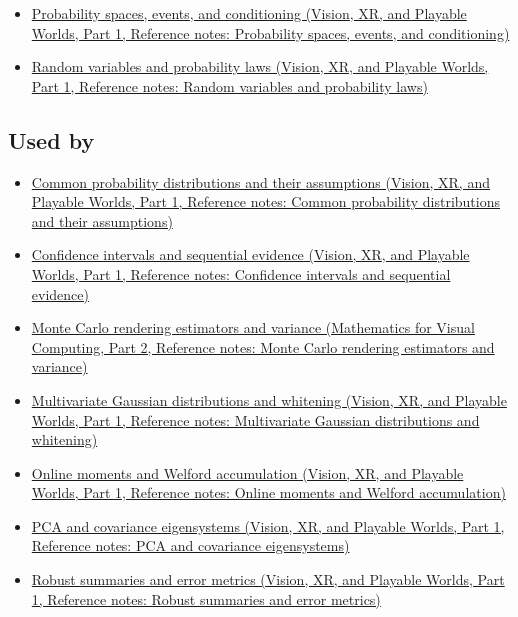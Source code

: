 \begin{itemize}
\tightlist
\item
  \href{../07-Vision-XR-and-Playable-Worlds-P01/main.pdf\#nameddest=appendix-f1ef323f6ed7}{Probability spaces, events, and conditioning (Vision, XR, and Playable Worlds, Part 1, Reference notes: Probability spaces, events, and conditioning)}
\item
  \href{../07-Vision-XR-and-Playable-Worlds-P01/main.pdf\#nameddest=appendix-4d0203f7944f}{Random variables and probability laws (Vision, XR, and Playable Worlds, Part 1, Reference notes: Random variables and probability laws)}
\end{itemize}

\subsection{Used by}\label{appendix-54c383df9992-used-by}

\hypertarget{appendix-54c383df9992-used-by}{}

\begin{itemize}
\tightlist
\item
  \href{../07-Vision-XR-and-Playable-Worlds-P01/main.pdf\#nameddest=appendix-a2360b435383}{Common probability distributions and their assumptions (Vision, XR, and Playable Worlds, Part 1, Reference notes: Common probability distributions and their assumptions)}
\item
  \href{../07-Vision-XR-and-Playable-Worlds-P01/main.pdf\#nameddest=appendix-c83016554b1e}{Confidence intervals and sequential evidence (Vision, XR, and Playable Worlds, Part 1, Reference notes: Confidence intervals and sequential evidence)}
\item
  \href{../02-Mathematics-for-Visual-Computing-P02/main.pdf\#nameddest=appendix-031e02bf28af}{Monte Carlo rendering estimators and variance (Mathematics for Visual Computing, Part 2, Reference notes: Monte Carlo rendering estimators and variance)}
\item
  \href{../07-Vision-XR-and-Playable-Worlds-P01/main.pdf\#nameddest=appendix-12bbe185dbe5}{Multivariate Gaussian distributions and whitening (Vision, XR, and Playable Worlds, Part 1, Reference notes: Multivariate Gaussian distributions and whitening)}
\item
  \href{../07-Vision-XR-and-Playable-Worlds-P01/main.pdf\#nameddest=appendix-33237f0f618b}{Online moments and Welford accumulation (Vision, XR, and Playable Worlds, Part 1, Reference notes: Online moments and Welford accumulation)}
\item
  \href{../07-Vision-XR-and-Playable-Worlds-P01/main.pdf\#nameddest=appendix-ad175ef3c5bf}{PCA and covariance eigensystems (Vision, XR, and Playable Worlds, Part 1, Reference notes: PCA and covariance eigensystems)}
\item
  \href{../07-Vision-XR-and-Playable-Worlds-P01/main.pdf\#nameddest=appendix-bcc44e9d3d02}{Robust summaries and error metrics (Vision, XR, and Playable Worlds, Part 1, Reference notes: Robust summaries and error metrics)}
\end{itemize}

